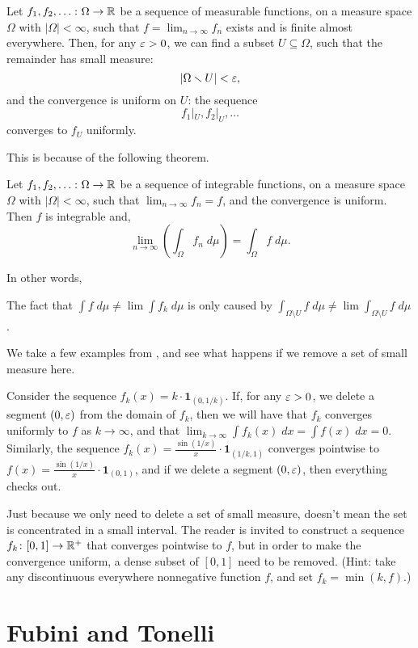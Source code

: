 \begin{theorem}
	Let $f_1, f_2, \dots \colon \Omega \to \mathbb R$
	be a sequence of measurable functions, on a measure space $\Omega$ with $|\Omega| < \infty$,
	such that $f = \lim_{n \to \infty} f_n$ exists and is finite almost everywhere.
	Then, for any $\varepsilon>0$,
	we can find a subset $U \subseteq \Omega$, such that
	the remainder has small measure:
	\[
		|\Omega \smallsetminus U| < \varepsilon,
	\]
	and the convergence is uniform on $U$: the sequence
	\[
		f_1|_U, f_2|_U, \dots
	\]
	converges to $f_U$ uniformly.
\end{theorem}

This is because of the following theorem.
\begin{theorem}
	Let $f_1, f_2, \dots \colon \Omega \to \mathbb R$
	be a sequence of integrable functions, on a measure space $\Omega$ with $|\Omega| < \infty$,
	such that $\lim_{n \to \infty} f_n = f$, and the convergence is uniform.
	Then $f$ is integrable and,
	\[ \lim_{n \to \infty} \left( \int_\Omega f_n \; d\mu \right)
		= \int_\Omega f \; d\mu. \]
\end{theorem}

In other words,
\begin{moral}
	The fact that $\int f \; d\mu \neq \lim \int f_k \; d\mu$ is only caused by
	$\int_{ \Omega \setminus U } f \; d\mu \neq \lim \int_{ \Omega \setminus U } f \; d\mu$.
\end{moral}

\begin{example}
	We take a few examples from \label{ex:failure_interchange_lim_int}, and see what happens if we remove
	a set of small measure here.
	\begin{itemize}
		\ii Consider the sequence $f_k(x) = k \cdot \mathbf{1}_{(0, 1/k)}$. If, for any $\varepsilon>0$,
		we delete a segment $(0, \varepsilon)$ from the domain of $f_k$, then we will have that $f_k$ converges
		uniformly to $f$ as $k \to \infty$, and that $\lim_{k \to \infty} \int f_k(x) \; dx = \int f(x)
		\; dx = 0$.
		\ii Similarly, the sequence $f_k(x) = \frac{\sin(1/x)}{x} \cdot \mathbf{1}_{(1/k, 1)}$
		converges pointwise to $f(x) = \frac{\sin(1/x)}{x} \cdot \mathbf{1}_{(0, 1)}$,
		and if we delete a segment $(0, \varepsilon)$, then everything checks out.
	\end{itemize}
\end{example}

\begin{remark}
	Just because we only need to delete a set of small measure, doesn't mean the set is concentrated in a
	small interval. The reader is invited to construct a sequence $f_k \colon [0, 1] \to \mathbb R^+$
	that converges pointwise to $f$, but in order to make the convergence uniform, a dense subset of $[0,
	1]$ need to be removed.
	(Hint: take any discontinuous everywhere nonnegative function $f$, and set $f_k = \min(k, f)$.)
\end{remark}

\section{Fubini and Tonelli}

\section{\problemhead}
